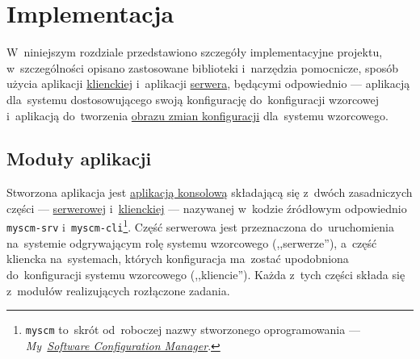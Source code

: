 \documentclass[thesis]{subfiles}
\begin{document}
\chapter{Implementacja}
\label{ch:implementacja}

W~niniejszym rozdziale przedstawiono szczegóły implementacyjne projektu, w~szczególności opisano zastosowane biblioteki i~narzędzia pomocnicze, sposób użycia aplikacji \hyperref[sec:cli-app]{klienckiej} i~aplikacji \hyperref[sec:srv-app]{serwera}, będącymi odpowiednio --- aplikacją dla~systemu dostosowującego swoją konfigurację do~konfiguracji wzorcowej i~aplikacją do~tworzenia \hyperref[sec:obraz-zmian-konfiguracji]{obrazu zmian konfiguracji} dla~systemu wzorcowego.


\section{Moduły aplikacji}

Stworzona aplikacja jest \href{https://en.wikipedia.org/wiki/Command-line_interface}{aplikacją konsolową} składającą się z~dwóch zasadniczych części --- \hyperref[sec:srv-app]{serwerowej} i~\hyperref[sec:cli-app]{klienckiej} --- nazywanej w~kodzie źródłowym odpowiednio \texttt{myscm-srv} i~\texttt{myscm-cli}\footnote{\texttt{myscm} to~skrót od~roboczej nazwy stworzonego oprogramowania --- \emph{My~\href{https://en.wikipedia.org/wiki/Software_configuration_management}{Software Configuration Manager}}.}. Część serwerowa jest przeznaczona do~uruchomienia na~systemie odgrywającym rolę systemu wzorcowego (,,serwerze''), a~część kliencka na~systemach, których konfiguracja ma~zostać upodobniona do~konfiguracji systemu wzorcowego (,,kliencie''). Każda z~tych części składa się z~modułów realizujących rozłączone zadania.
\end{document}
